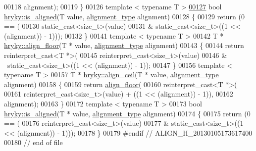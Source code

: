 \begin{DoxyCode}
00118         alignment);
00119 \}
00126 \textcolor{keyword}{template} < \textcolor{keyword}{typename} T >
\hypertarget{align_8h_source_l00127}{}\hyperlink{namespacehryky_abb8da7a8ab9766df31c47826f2bf1a40}{00127} \textcolor{keywordtype}{bool} \hyperlink{namespacehryky_abb8da7a8ab9766df31c47826f2bf1a40}{hryky::is_aligned}(T value, \hyperlink{namespacehryky_aee1af251193c2d308aaa68ef7e36a540}{alignment_type} alignment)
00128 \{
00129     \textcolor{keywordflow}{return} (0 == (
00130         static\_cast<size\_t>(value)
00131         & static\_cast<size\_t>((1 << (alignment)) - 1)));
00132 \}
00141 \textcolor{keyword}{template} < \textcolor{keyword}{typename} T >
00142 T * \hyperlink{namespacehryky_a84803d86a3bb217481dd0a180734fb8f}{hryky::align_floor}(T * value, \hyperlink{namespacehryky_aee1af251193c2d308aaa68ef7e36a540}{alignment_type} alignment)
00143 \{ 
00144     \textcolor{keywordflow}{return} \textcolor{keyword}{reinterpret\_cast<}T *\textcolor{keyword}{>}(
00145         \textcolor{keyword}{reinterpret\_cast<}\textcolor{keywordtype}{size\_t}\textcolor{keyword}{>}(value)
00146         & ~static\_cast<size\_t>((1 << (alignment)) - 1));
00147 \}
00156 \textcolor{keyword}{template} < \textcolor{keyword}{typename} T >
00157 T * \hyperlink{namespacehryky_a7ddd0f39f2f0953fe7e3cbaedaf98644}{hryky::align_ceil}(T * value, \hyperlink{namespacehryky_aee1af251193c2d308aaa68ef7e36a540}{alignment_type} alignment)
00158 \{
00159     \textcolor{keywordflow}{return} \hyperlink{namespacehryky_a84803d86a3bb217481dd0a180734fb8f}{align_floor}(
00160         reinterpret\_cast<T *>(
00161             reinterpret\_cast<size\_t>(value) + ((1 << (alignment)) - 1)),
00162         alignment);
00163 \}
00172 \textcolor{keyword}{template} < \textcolor{keyword}{typename} T >
00173 \textcolor{keywordtype}{bool} \hyperlink{namespacehryky_abb8da7a8ab9766df31c47826f2bf1a40}{hryky::is_aligned}(T * value, \hyperlink{namespacehryky_aee1af251193c2d308aaa68ef7e36a540}{alignment_type} alignment)
00174 \{
00175     \textcolor{keywordflow}{return} (0 == (
00176         reinterpret\_cast<size\_t>(value)
00177         & static\_cast<size\_t>((1 << (alignment)) - 1)));
00178 \}
00179 \textcolor{preprocessor}{#endif // ALIGN\_H\_20130105173617400}
00180 \textcolor{preprocessor}{}\textcolor{comment}{// end of file}
\end{DoxyCode}
